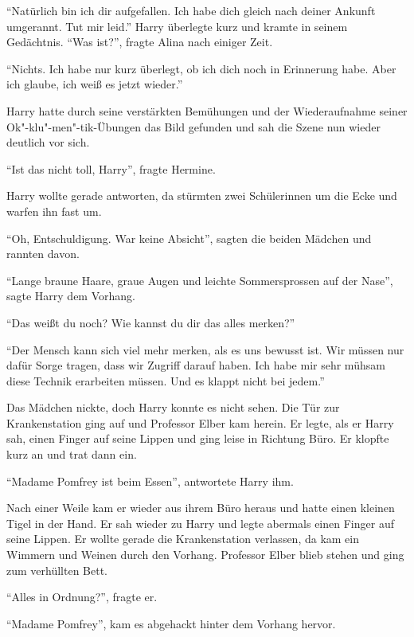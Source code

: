 \enquote{Natürlich bin ich dir aufgefallen. Ich habe dich gleich nach deiner Ankunft umgerannt. Tut mir leid.} Harry überlegte kurz und kramte in seinem Gedächtnis. \enquote{Was ist?}, fragte Alina nach einiger Zeit.

\enquote{Nichts. Ich habe nur kurz überlegt, ob ich dich noch in Erinnerung habe. Aber ich glaube, ich weiß es jetzt wieder.}

Harry hatte durch seine verstärkten Bemühungen und der Wiederaufnahme seiner Ok"-klu"-men"-tik-Übungen das Bild gefunden und sah die Szene nun wieder deutlich vor sich.

\begin{rueckblick}
\enquote{Ist das nicht toll, Harry}, fragte Hermine.

Harry wollte gerade antworten, da stürmten zwei Schülerinnen um die Ecke und warfen ihn fast um.

\enquote{Oh, Entschuldigung. War keine Absicht}, sagten die beiden Mädchen und rannten davon.
\end{rueckblick}

\enquote{Lange braune Haare, graue Augen und leichte Sommersprossen auf der Nase}, sagte Harry dem Vorhang.

 \enquote{Das weißt du noch? Wie kannst du dir das alles merken?}

\enquote{Der Mensch kann sich viel mehr merken, als es uns bewusst ist. Wir müssen nur dafür Sorge tragen, dass wir Zugriff darauf haben. Ich habe mir sehr mühsam diese Technik erarbeiten müssen. Und es klappt nicht bei jedem.}

Das Mädchen nickte, doch Harry konnte es nicht sehen. Die Tür zur Krankenstation ging auf und Professor Elber kam herein. Er legte, als er Harry sah, einen Finger auf seine Lippen und ging leise in Richtung Büro. Er klopfte kurz an und trat dann ein.

\enquote{Madame Pomfrey ist beim Essen}, antwortete Harry ihm.

Nach einer Weile kam er wieder aus ihrem Büro heraus und hatte einen kleinen Tigel in der Hand. Er sah wieder zu Harry und legte abermals einen Finger auf seine Lippen. Er wollte gerade die Krankenstation verlassen, da kam ein Wimmern und Weinen durch den Vorhang. Professor Elber blieb stehen und ging zum verhüllten Bett.

\enquote{Alles in Ordnung?}, fragte er.

\enquote{Madame Pomfrey}, kam es abgehackt hinter dem Vorhang hervor.

